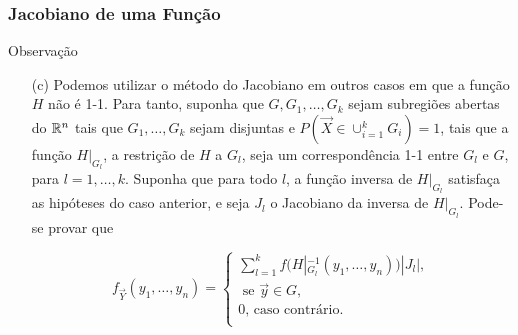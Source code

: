 \begin{frame}
\frametitle{\textbf{Jacobiano de uma Função}}
\baselineskip=13pt
\begin{block}{Observação}

\begin{enumerate}
\item[(c)] Podemos utilizar o método do Jacobiano em outros casos em que a função $H$ não é 1-1. Para tanto, suponha que $G,G_1,\ldots,G_k$ sejam subregiões abertas do $\mathbb{R}^n$ tais que $G_1,\ldots,G_k$ sejam disjuntas e $P(\vec{X}\in\cup_{i=1}^{k}G_i)=1$, tais que a função $H|_{G_l}$, a restrição de $H$ a $G_l$, seja um correspondência 1-1 entre $G_l$ e $G$, para $l=1,\ldots,k$. Suponha que para todo $l$, a função inversa de $H|_{G_l}$ satisfaça as hipóteses do caso anterior, e seja $J_l$ o Jacobiano da inversa de $H|_{G_l}$. Pode-se provar que


\[
f_{\vec{Y}}(y_1,\ldots,y_n)=\left\{
\begin{array}{l}
\sum_{l=1}^{k}f(H|_{G_l}^{-1}(y_1,\ldots,y_n))|J_l|, \\
\mbox{\ \ \ se $\vec{y}\in G$,} \\
0 \mbox{, caso contrário.}\\
\end{array}
\right.
\]

\end{enumerate}

\end{block}
\end{frame}



